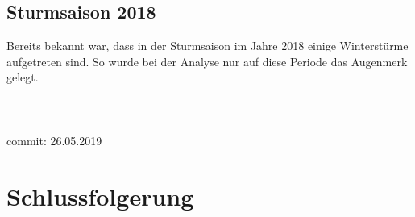 \begin{refsection}
\subsection{Sturmsaison 2018}
Bereits bekannt war, dass in der Sturmsaison im Jahre 2018 einige Winterstürme aufgetreten sind. So wurde bei der Analyse nur auf diese Periode das Augenmerk gelegt.
\\
\\
\\
\\
commit: 26.05.2019





\section{Schlussfolgerung}

\printbibliography[heading=subbibliography]
\end{refsection}
